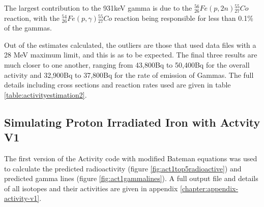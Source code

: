 The largest contribution to the 931keV gamma is due to the ${}^{56}_{26} Fe (p, 2n) {}^{55}_{27} Co$
reaction, with the ${}^{54}_{26} Fe (p, \gamma) {}^{55}_{27} Co$ reaction being responsible for less than 0.1\% of the gammas.

Out of the estimates calculated, the outliers are those that used data files with a 28 MeV maximum limit, and this is as to be expected.  The final three results are much closer to one another, ranging from 43,800Bq to 50,400Bq for the overall activity and 32,900Bq to 37,800Bq for the rate of emission of Gammas.  The full details including cross sections and reaction rates used are given in table \ref{table:activityestimation2}.


\FloatBarrier


\subsection{Simulating Proton Irradiated Iron with Actvity V1}

The first version of the Activity code with modified Bateman equations was used to calculate the predicted radioactivity (figure \ref{fig:act1top5radioactive}) and predicted gamma lines (figure \ref{fig:act1gammalines}).  A full output file and details of all isotopes and their activities are given in appendix \ref{chapter:appendix-activity-v1}.

